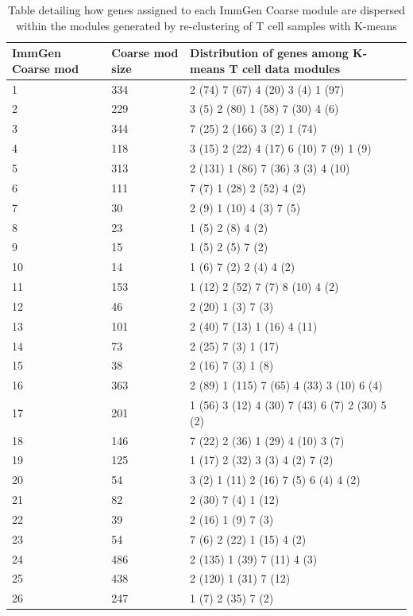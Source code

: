 \begin{landscape}
\small 
\begin{longtable}{|p{1.5cm}|p{1.25cm}|p{21cm}|}
\caption{Table detailing how genes assigned to each ImmGen Coarse module are dispersed within the modules generated by re-clustering of T cell samples with K-means}\\
\hline
ImmGen Coarse mod & Coarse mod size & Distribution of genes among K-means T cell data modules \\
\hline

1 & 334 & 2 (74) 7 (67) 4 (20) 3 (4) 1 (97) \\
2 & 229 & 3 (5) 2 (80) 1 (58) 7 (30) 4 (6) \\
3 & 344 & 7 (25) 2 (166) 3 (2) 1 (74) \\
4 & 118 & 3 (15) 2 (22) 4 (17) 6 (10) 7 (9) 1 (9) \\
5 & 313 & 2 (131) 1 (86) 7 (36) 3 (3) 4 (10) \\
6 & 111 & 7 (7) 1 (28) 2 (52) 4 (2) \\
7 & 30 & 2 (9) 1 (10) 4 (3) 7 (5) \\
8 & 23 & 1 (5) 2 (8) 4 (2) \\
9 & 15 & 1 (5) 2 (5) 7 (2) \\
10 & 14 & 1 (6) 7 (2) 2 (4) 4 (2) \\
11 & 153 & 1 (12) 2 (52) 7 (7) 8 (10) 4 (2) \\
12 & 46 & 2 (20) 1 (3) 7 (3) \\
13 & 101 & 2 (40) 7 (13) 1 (16) 4 (11) \\
14 & 73 & 2 (25) 7 (3) 1 (17) \\
15 & 38 & 2 (16) 7 (3) 1 (8) \\
16 & 363 & 2 (89) 1 (115) 7 (65) 4 (33) 3 (10) 6 (4) \\
17 & 201 & 1 (56) 3 (12) 4 (30) 7 (43) 6 (7) 2 (30) 5 (2) \\
18 & 146 & 7 (22) 2 (36) 1 (29) 4 (10) 3 (7) \\
19 & 125 & 1 (17) 2 (32) 3 (3) 4 (2) 7 (2) \\
20 & 54 & 3 (2) 1 (11) 2 (16) 7 (5) 6 (4) 4 (2) \\
21 & 82 & 2 (30) 7 (4) 1 (12) \\
22 & 39 & 2 (16) 1 (9) 7 (3) \\
23 & 54 & 7 (6) 2 (22) 1 (15) 4 (2) \\
24 & 486 & 2 (135) 1 (39) 7 (11) 4 (3) \\
25 & 438 & 2 (120) 1 (31) 7 (12) \\
26 & 247 & 1 (7) 2 (35) 7 (2) \\

\end{longtable}
\end{landscape}
